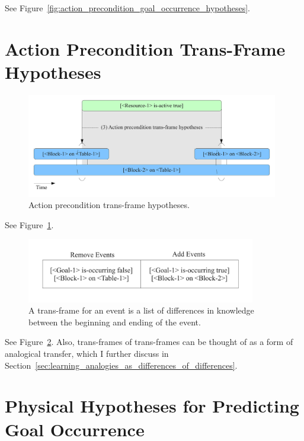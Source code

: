See Figure~\ref{fig:action_precondition_goal_occurrence_hypotheses}.


\section{Action Precondition Trans-Frame Hypotheses}
\label{sec:learning_trans_frames_for_events}

\begin{figure}[bth]
  \center
  \includegraphics[width=11cm]{gfx/learning_to_plan-3-action_precondition_transframe_hypotheses}
  \caption[Action precondition trans-frame hypotheses]{Action precondition trans-frame hypotheses.}
  \label{fig:action_precondition_transframe_hypotheses}
\end{figure}

See Figure~\ref{fig:action_precondition_transframe_hypotheses}.

\begin{figure}[bth]
  \center
  \includegraphics[width=10cm]{gfx/transframe}
  \caption[A trans-frame for an event]{A trans-frame for an event is a
    list of differences in knowledge between the beginning and ending
    of the event.}
  \label{fig:transframe}
\end{figure}

See Figure~\ref{fig:transframe}.  Also, trans-frames of trans-frames
can be thought of as a form of analogical transfer, which I further
discuss in
Section~\ref{sec:learning_analogies_as_differences_of_differences}.



\section{Physical Hypotheses for Predicting Goal Occurrence}

